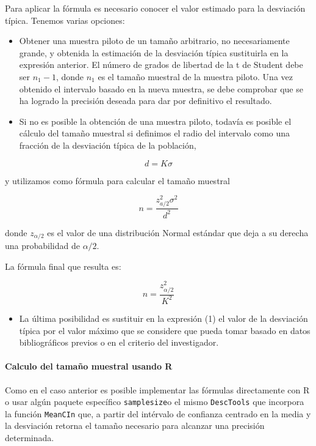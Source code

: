 \documentclass[
]{article}
\providecommand{\tightlist}{%
  \setlength{\itemsep}{0pt}\setlength{\parskip}{0pt}}
\begin{document}
Para aplicar la fórmula es necesario conocer el valor estimado para la desviación típica. Tenemos varias opciones:

\begin{itemize}
\tightlist
\item
  Obtener una muestra piloto de un tamaño arbitrario, no necesariamente grande, y obtenida la estimación de la desviación típica sustituirla en la expresión anterior. El número de grados de libertad de la t de Student debe ser \(n_{1}-1\), donde \(n_{1}\) es el tamaño muestral de la muestra piloto. Una vez obtenido el intervalo basado en la nueva muestra, se debe comprobar que se ha logrado la precisión deseada para dar por definitivo el resultado.
\item
  Si no es posible la obtención de una muestra piloto, todavía es posible el cálculo del tamaño muestral si definimos el radio del intervalo como una fracción de la desviación típica de la población,
\end{itemize}

\[
d=K \sigma
\]

y utilizamos como fórmula para calcular el tamaño muestral

\[
n=\frac{z_{a / 2}^{2} \sigma^{2}}{d^{2}}
\]

donde \(z_{\alpha / 2}\) es el valor de una distribución Normal estándar que deja a su derecha una probabilidad de \(\alpha / 2\).

La fórmula final que resulta es:

\[
n=\frac{z_{\alpha / 2}^{2}}{K^{2}}
\]

\begin{itemize}
\tightlist
\item
  La última posibilidad es sustituir en la expresión (1) el valor de la desviación típica por el valor máximo que se considere que pueda tomar basado en datos bibliográficos previos o en el criterio del investigador.
\end{itemize}

\paragraph{Calculo del tamaño muestral usando R}\label{calculo-del-tamauxf1o-muestral-usando-r}

Como en el caso anterior es posible implementar las fórmulas directamente con R o usar algún paquete específico \texttt{samplesize}o el mismo \texttt{DescTools} que incorpora la función \texttt{MeanCIn} que, a partir del intérvalo de confianza centrado en la media y la desviación retorna el tamaño necesario para alcanzar una precisión determinada.
\end{document}
